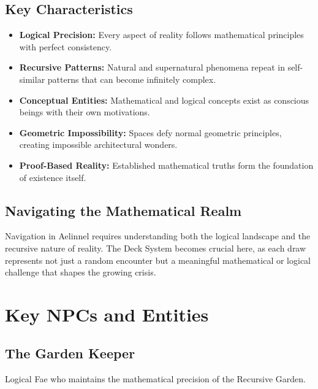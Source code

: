 \documentclass[11pt]{article}
\begin{document}
\subsection{Key Characteristics}

\begin{itemize}
\item \textbf{Logical Precision:} Every aspect of reality follows mathematical principles with perfect consistency.
\item \textbf{Recursive Patterns:} Natural and supernatural phenomena repeat in self-similar patterns that can become infinitely complex.
\item \textbf{Conceptual Entities:} Mathematical and logical concepts exist as conscious beings with their own motivations.
\item \textbf{Geometric Impossibility:} Spaces defy normal geometric principles, creating impossible architectural wonders.
\item \textbf{Proof-Based Reality:} Established mathematical truths form the foundation of existence itself.
\end{itemize}

\subsection{Navigating the Mathematical Realm}

Navigation in Aelinnel requires understanding both the logical landscape and the recursive nature of reality. The Deck System becomes crucial here, as each draw represents not just a random encounter but a meaningful mathematical or logical challenge that shapes the growing crisis.

\section{Key NPCs and Entities}

\subsection{The Garden Keeper}

Logical Fae who maintains the mathematical precision of the Recursive Garden.
\end{document}

